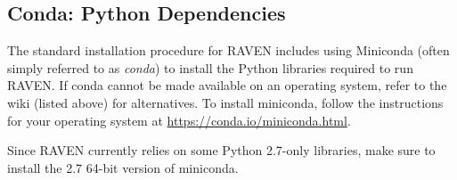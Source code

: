 \subsection{Conda: Python Dependencies}
\label{sec:install conda}

The standard installation procedure for RAVEN includes using Miniconda (often simply referred to as
\emph{conda}) to install the Python libraries required to run RAVEN.  If conda cannot be made available on an
operating system, refer to the wiki (listed above) for alternatives.  To install miniconda, follow the
instructions for your operating system at \url{https://conda.io/miniconda.html}.

Since RAVEN currently relies
on some Python 2.7-only libraries, make sure to install the 2.7 64-bit version of miniconda.
